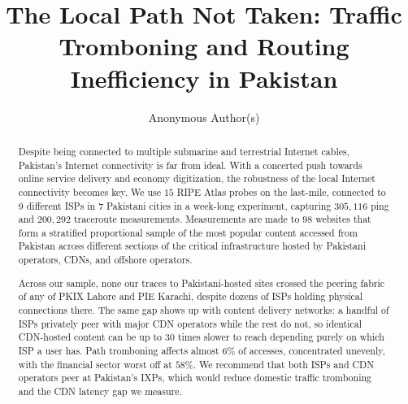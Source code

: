 \documentclass[sigconf,anonymous,10pt]{acmart}
\begin{document}
\title{The Local Path Not Taken: Traffic Tromboning and Routing Inefficiency in Pakistan}

\author{Anonymous Author(s)}

\renewcommand{\shortauthors}{Anonymous et al.}

\begin{abstract}
Despite being connected to multiple submarine and terrestrial Internet cables, Pakistan's Internet connectivity is far from ideal. With a concerted push towards online service delivery and economy digitization, the robustness of the local Internet connectivity becomes key. We use $15$ RIPE Atlas probes on the last-mile, connected to $9$ different ISPs in $7$ Pakistani cities in a week-long experiment, capturing $305,116$ ping and $200,292$ traceroute measurements. Measurements are made to $98$ websites that form a stratified proportional sample of the most popular content accessed from Pakistan across different sections of the critical infrastructure hosted by Pakistani operators, CDNs, and offshore operators.  

Across our sample, none our traces to Pakistani-hosted sites crossed the peering fabric of any of PKIX Lahore and PIE Karachi, despite dozens of ISPs holding physical connections there. The same gap shows up with content delivery networks: a handful of ISPs privately peer with major CDN operators while the rest do not, so identical CDN-hosted content can be up to $30$ times slower to reach depending purely on which ISP a user has. Path tromboning affects almost $6\%$ of accesses, concentrated unevenly, with the financial sector worst off at $58\%$. We recommend that both ISPs and CDN operators peer at Pakistan's IXPs, which would reduce domestic traffic tromboning and the CDN latency gap we measure.


\end{abstract}
\end{document}
